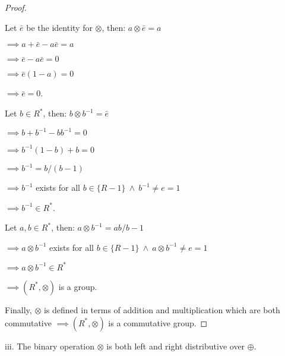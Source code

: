 \documentclass{article}
\begin{document}
\begin{proof}
  $ $

  Let $\bar{e}$ be the identity for $\otimes$, then: $ a \otimes \bar{e} = a$
  
  $\implies a+\bar{e}-a\bar{e} = a$

  $\implies \bar{e} - a\bar{e} = 0$

  $\implies \bar{e}(1-a) = 0$

  $\implies \bar{e} = 0$.
  \newline

  Let $b \in R^*$, then: $b \otimes b^{-1} = \bar{e}$
  
  $\implies b + b^{-1} - bb^{-1}= 0$

  $\implies b^{-1}(1-b) + b = 0$

  $\implies b^{-1}= b/(b-1)$

  $\implies b^{-1}$ exists for all $b \in \{R - 1\} \ \land \ b^{-1} \neq e = 1$

  $\implies b^{-1} \in R^*$.
  \newline

  Let $a,b \in R^*$, then: $a \otimes b^{-1} = ab/b-1$

  $\implies a \otimes b^{-1}$ exists for all $b \in \{R - 1\} \ \land \ a \otimes b^{-1} \neq e = 1$

  $\implies a \otimes b^{-1} \in R^*$

  $\implies (R^*, \otimes)$ is a group.
  \newline

  Finally, $\otimes$ is defined in terms of addition and multiplication which are both commutative $\implies (R^*, \otimes)$ is a commutative group.
  
\end{proof}

\noindent
iii. The binary operation $\otimes$ is both left and right distributive over $\oplus$.
\end{document}
